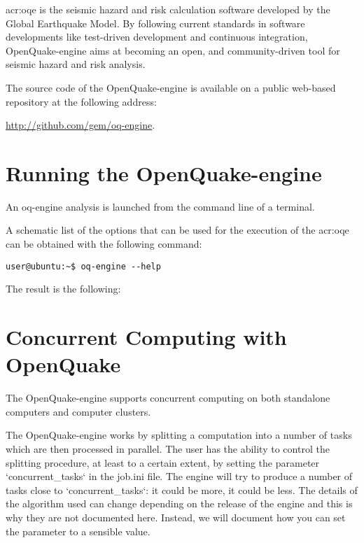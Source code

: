 \gls{acr:oqe} is the seismic hazard and risk calculation software developed by
the Global Earthquake Model. By following current standards in software
developments like test-driven development and continuous integration,
OpenQuake-engine aims at becoming an open, and community-driven tool for
seismic hazard and risk analysis.

The source code of the OpenQuake-engine is available on a public web-based
repository at the following address:

\href{http://github.com/gem/oq-engine}{http://github.com/gem/oq-engine}.


\section{Running the OpenQuake-engine}
\label{sec:running_oq_engine}

An oq-engine analysis is launched from the command line of a terminal.

A schematic list of the options that can be used for the execution of the
\gls{acr:oqe} can be obtained with the following command:

\begin{Verbatim}[frame=single, commandchars=\\\{\}, fontsize=\small]
user@ubuntu:~$ oq-engine --help
\end{Verbatim}

The result is the following:



\section{Concurrent Computing with OpenQuake}
\label{sec:concurrent_tasks}

The OpenQuake-engine supports concurrent computing on both standalone
computers and computer clusters.

The OpenQuake-engine works by splitting a computation into a number of tasks
which are then processed in parallel. The user has the ability to control the
splitting procedure, at least to a certain extent, by setting the parameter
`concurrent\_tasks` in the job.ini file. The engine will try to produce a
number of tasks close to `concurrent\_tasks`: it could be more, it could be
less. The details of the algorithm used can change depending on the release of
the engine and this is why they are not documented here. Instead, we will
document how you can set the parameter to a sensible value.

